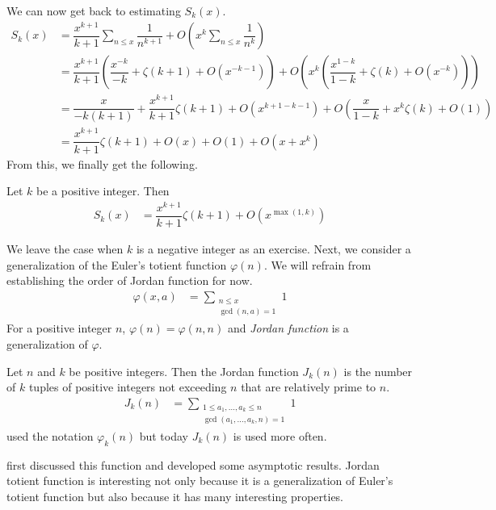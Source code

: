 \documentclass[elemannt.tex]{subfile}
\begin{document}
	We can now get back to estimating $S_{k}(x)$.
		\begin{align*}
			S_{k}(x)
				& = \dfrac{x^{k+1}}{k+1}\sum_{n\leq x}\dfrac{1}{n^{k+1}}+O\left(x^{k}\sum_{n\leq x}\dfrac{1}{n^{k}}\right)\\
				& = \dfrac{x^{k+1}}{k+1}\left(\dfrac{x^{-k}}{-k}+\zeta(k+1)+O(x^{-k-1})\right)+O\left(x^{k}\left(\dfrac{x^{1-k}}{1-k}+\zeta(k)+O(x^{-k})\right)\right)\\
				& = \dfrac{x}{-k(k+1)}+\dfrac{x^{k+1}}{k+1}\zeta(k+1)+O(x^{k+1-k-1})+O\left(\dfrac{x}{1-k}+x^{k}\zeta(k)+O(1)\right)\\
				& = \dfrac{x^{k+1}}{k+1}\zeta(k+1)+O(x)+O(1)+O(x+x^{k})
		\end{align*}
	From this, we finally get the following.
		\begin{theorem}
			Let $k$ be a positive integer. Then
				\begin{align*}
					S_{k}(x)
						& = \dfrac{x^{k+1}}{k+1}\zeta(k+1)+O(x^{\max(1,k)})
				\end{align*}
		\end{theorem}
	We leave the case when $k$ is a negative integer as an exercise. Next, we consider a generalization of the Euler's totient function $\varphi(n)$. We will refrain from establishing the order of Jordan function for now.
		\begin{align*}
			\varphi(x,a)
				& = \sum_{\substack{n\leq x\\\gcd(n,a)=1}}1
		\end{align*}
	For a positive integer $n$, $\varphi(n)=\varphi(n,n)$ and \textit{Jordan function} is a generalization of $\varphi$.
		\begin{definition}
			Let $n$ and $k$ be positive integers. Then the Jordan function $J_{k}(n)$ is the number of $k$ tuples of positive integers not exceeding $n$ that are relatively prime to $n$.
				\begin{align*}
					J_{k}(n)
						& = \sum_{\substack{1\leq a_{1},\ldots,a_{k}\leq n\\\gcd(a_{1},\ldots,a_{k},n)=1}}1
				\end{align*}
			\textcite{lehmer_1900} used the notation $\varphi_{k}(n)$ but today $J_{k}(n)$ is used more often.
		\end{definition}
	\textcite[Page $95-97$]{jordan_1989} first discussed this function and \textcite{lehmer_1900} developed some asymptotic results. Jordan totient function is interesting not only because it is a generalization of Euler's totient function but also because it has many interesting properties.
\end{document}
